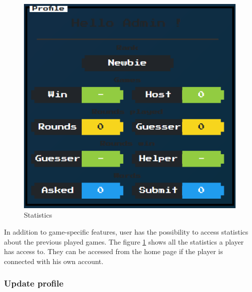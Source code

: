 \documentclass{tnreport}
\begin{document}
\begin{figure}
	\centering
	\vspace*{-2cm}
	\includegraphics[scale=0.5]{figures/statistics}
	\caption{Statistics}
	\label{fig:statistics}
	\vspace*{-2cm}
\end{figure}

In addition to game-specific features, user has the possibility to access statistics about the previous played games. The figure \ref{fig:statistics} shows all the statistics a player has access to. They can be accessed from the home page if the player is connected with his own account. 

\bigskip
\bigskip
\bigskip

\subsubsection{Update profile}
\end{document}
